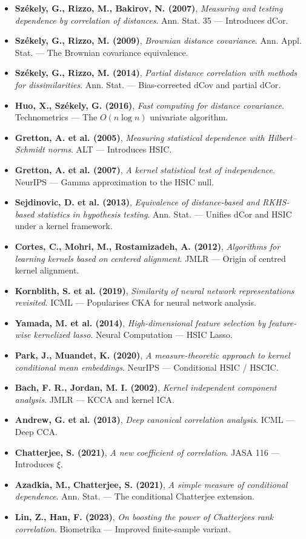 \documentclass{article}
\providecommand{\tightlist}{\setlength{\itemsep}{0pt}\setlength{\parskip}{0pt}}
\begin{document}
\begin{itemize}
\tightlist
\item
  \textbf{Székely, G., Rizzo, M., Bakirov, N. (2007)}, \emph{Measuring
  and testing dependence by correlation of distances}. Ann. Stat. 35 ---
  Introduces dCor.
\item
  \textbf{Székely, G., Rizzo, M. (2009)}, \emph{Brownian distance
  covariance}. Ann. Appl. Stat. --- The Brownian covariance equivalence.
\item
  \textbf{Székely, G., Rizzo, M. (2014)}, \emph{Partial distance
  correlation with methods for dissimilarities}. Ann. Stat. ---
  Bias-corrected dCov and partial dCor.
\item
  \textbf{Huo, X., Székely, G. (2016)}, \emph{Fast computing for
  distance covariance}. Technometrics --- The \(O(n \log n)\) univariate
  algorithm.
\item
  \textbf{Gretton, A. et al. (2005)}, \emph{Measuring statistical
  dependence with Hilbert--Schmidt norms}. ALT --- Introduces HSIC.
\item
  \textbf{Gretton, A. et al. (2007)}, \emph{A kernel statistical test of
  independence}. NeurIPS --- Gamma approximation to the HSIC null.
\item
  \textbf{Sejdinovic, D. et al. (2013)}, \emph{Equivalence of
  distance-based and RKHS-based statistics in hypothesis testing}. Ann.
  Stat. --- Unifies dCor and HSIC under a kernel framework.
\item
  \textbf{Cortes, C., Mohri, M., Rostamizadeh, A. (2012)},
  \emph{Algorithms for learning kernels based on centered alignment}.
  JMLR --- Origin of centred kernel alignment.
\item
  \textbf{Kornblith, S. et al. (2019)}, \emph{Similarity of neural
  network representations revisited}. ICML --- Popularises CKA for
  neural network analysis.
\item
  \textbf{Yamada, M. et al. (2014)}, \emph{High-dimensional feature
  selection by feature-wise kernelized lasso}. Neural Computation ---
  HSIC Lasso.
\item
  \textbf{Park, J., Muandet, K. (2020)}, \emph{A measure-theoretic
  approach to kernel conditional mean embeddings}. NeurIPS ---
  Conditional HSIC / HSCIC.
\item
  \textbf{Bach, F. R., Jordan, M. I. (2002)}, \emph{Kernel independent
  component analysis}. JMLR --- KCCA and kernel ICA.
\item
  \textbf{Andrew, G. et al. (2013)}, \emph{Deep canonical correlation
  analysis}. ICML --- Deep CCA.
\item
  \textbf{Chatterjee, S. (2021)}, \emph{A new coefficient of
  correlation}. JASA 116 --- Introduces \(\xi\).
\item
  \textbf{Azadkia, M., Chatterjee, S. (2021)}, \emph{A simple measure of
  conditional dependence}. Ann. Stat. --- The conditional Chatterjee
  extension.
\item
  \textbf{Lin, Z., Han, F. (2023)}, \emph{On boosting the power of
  Chatterjee\textquotesingle s rank correlation}. Biometrika ---
  Improved finite-sample variant.
\end{itemize}
\end{document}
